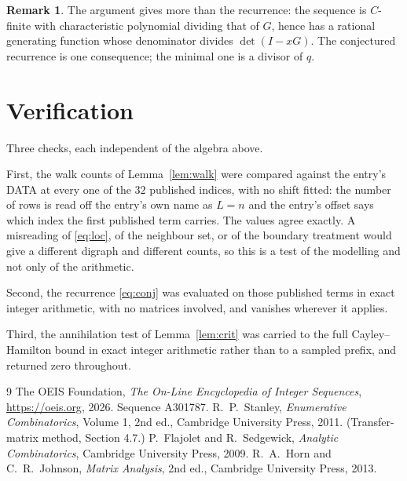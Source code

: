 \documentclass[11pt,a4paper]{article}
\theoremstyle{plain}
\theoremstyle{definition}
\newtheorem{remark}[theorem]{Remark}
\begin{document}
\begin{remark}
The argument gives more than the recurrence: the sequence is $C$-finite with characteristic
polynomial dividing that of $G$, hence has a rational generating function whose denominator
divides $\det(I-xG)$. The conjectured recurrence is one consequence; the minimal one is a
divisor of $q$.
\end{remark}

\section{Verification}

Three checks, each independent of the algebra above.

First, the walk counts of Lemma~\ref{lem:walk} were compared against the entry's DATA at
every one of the $32$ published indices, with no shift fitted: the number of rows is
read off the entry's own name as $L=n$ and the entry's offset says which index the first
published term carries. The values agree exactly. A misreading of \eqref{eq:loc}, of the
neighbour set, or of the boundary treatment would give a different digraph and different
counts, so this is a test of the modelling and not only of the arithmetic.

Second, the recurrence \eqref{eq:conj} was evaluated on those published terms in exact
integer arithmetic, with no matrices involved, and vanishes wherever it applies.

Third, the annihilation test of Lemma~\ref{lem:crit} was carried to the full
Cayley--Hamilton bound in exact integer arithmetic rather than to a sampled prefix, and
returned zero throughout.

\begin{thebibliography}{9}
 The OEIS Foundation, \emph{The On-Line Encyclopedia of Integer
Sequences}, \url{https://oeis.org}, 2026. Sequence A301787.
 R.~P.~Stanley, \emph{Enumerative Combinatorics}, Volume 1, 2nd ed.,
Cambridge University Press, 2011. (Transfer-matrix method, Section 4.7.)
 P.~Flajolet and R.~Sedgewick, \emph{Analytic Combinatorics}, Cambridge
University Press, 2009.
 R.~A.~Horn and C.~R.~Johnson, \emph{Matrix Analysis}, 2nd ed., Cambridge
University Press, 2013.
\end{thebibliography}
\end{document}
